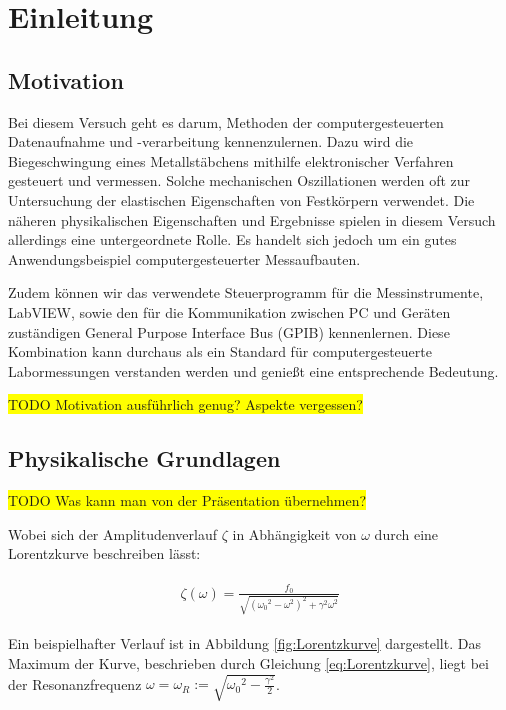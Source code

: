 \section{Einleitung}

\subsection{Motivation}

Bei diesem Versuch geht es darum, Methoden der computergesteuerten Datenaufnahme und -verarbeitung kennenzulernen.
Dazu wird die Biegeschwingung eines Metallstäbchens mithilfe elektronischer Verfahren gesteuert und vermessen.
Solche mechanischen Oszillationen werden oft zur Untersuchung der elastischen Eigenschaften von Festkörpern verwendet.
Die näheren physikalischen Eigenschaften und Ergebnisse spielen in diesem Versuch allerdings eine untergeordnete Rolle.
Es handelt sich jedoch um ein gutes Anwendungsbeispiel computergesteuerter Messaufbauten.

Zudem können wir das verwendete Steuerprogramm für die Messinstrumente, LabVIEW, sowie den für die Kommunikation zwischen PC und Geräten zuständigen General Purpose Interface Bus (GPIB) kennenlernen.
Diese Kombination kann durchaus als ein Standard für computergesteuerte Labormessungen verstanden werden und genießt eine entsprechende Bedeutung.

\colorbox{yellow}{TODO Motivation ausführlich genug? Aspekte vergessen?}

\subsection{Physikalische Grundlagen}

\colorbox{yellow}{TODO Was kann man von der Präsentation übernehmen?}

Wobei sich der Amplitudenverlauf $\zeta$ in Abhängigkeit von $\omega$ durch eine Lorentzkurve beschreiben lässt:

\begin{align}
    \label{eq:Lorentzkurve}
    \begin{split}
        \zeta \left( \omega \right) = \frac{f_0}{\sqrt{\left( {\omega_0}^2 - \omega^2 \right)^2 + \gamma^2\omega^2}}
    \end{split}
\end{align}

Ein beispielhafter Verlauf ist in Abbildung \ref{fig:Lorentzkurve} dargestellt.
Das Maximum der Kurve, beschrieben durch Gleichung \ref{eq:Lorentzkurve}, liegt bei der Resonanzfrequenz $\omega = \omega_R := \sqrt{{\omega_0}^2 - \frac{\gamma^2}{2}}$.

